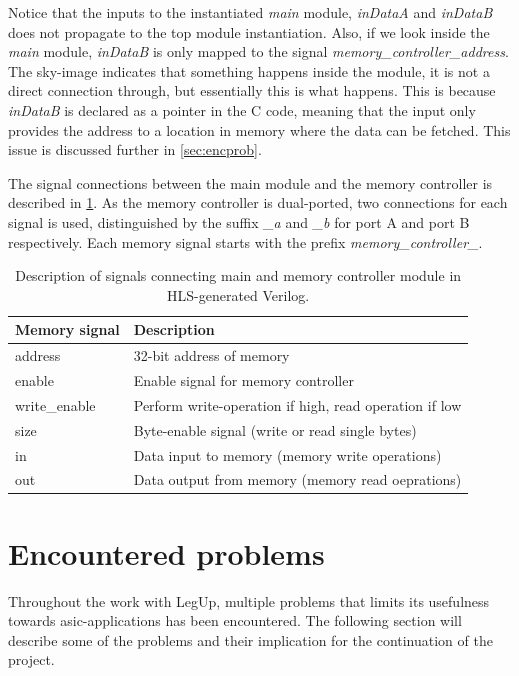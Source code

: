 Notice that the inputs to the instantiated \textit{main} module, \textit{inDataA} and \textit{inDataB} does not propagate to the top module instantiation. Also, if we look inside the \textit{main} module, \textit{inDataB} is only mapped to the signal \textit{memory\_controller\_address}. The sky-image indicates that something happens inside the module, it is not a direct connection through, but essentially this is what happens. This is because \textit{inDataB} is declared as a pointer in the C code, meaning that the input only provides the address to a location in memory where the data can be fetched. This issue is discussed further in \cref{sec:encprob}.

The signal connections between the main module and the memory controller is described in \cref{tab:hlsoutputsignals}. As the memory controller is dual-ported, two connections for each signal is used, distinguished by the suffix \textit{\_a} and \textit{\_b} for port A and port B respectively. Each memory signal starts with the prefix \textit{memory\_controller\_}.

\begin{table}[hbpt]
    \centering
    \caption{\label{tab:hlsoutputsignals}Description of signals connecting main and memory controller module in HLS-generated Verilog.}
    \begin{tabular}{ll}
      \textbf{Memory signal} & \textbf{Description}\\
      \toprule
      address & 32-bit address of memory \\
      \hline
      enable & Enable signal for memory controller \\
      \hline
      write\_enable & Perform write-operation if high, read operation if low\\
      \hline
      size & Byte-enable signal (write or read single bytes)\\
      \hline
      in & Data input to memory (memory write operations)\\
      \hline
      out & Data output from memory (memory read oeprations)\\
      \bottomrule
    \end{tabular}
\end{table}

\section{\label{sec:encprob}Encountered problems}
Throughout the work with LegUp, multiple problems that limits its usefulness towards \gls{asic}-applications has been encountered. The following section will describe some of the problems and their implication for the continuation of the project.

